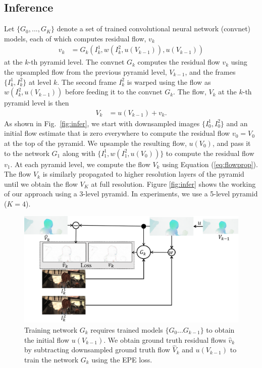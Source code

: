 \documentclass[10pt,twocolumn,letterpaper]{article}
\begin{document}
\subsection{Inference}
Let $\{G_0, ... ,G_K\}$ denote a  set of trained convolutional neural network (convnet) models,
each of which computes residual flow, $v_k$
\begin{align}
v_k &= G_k(I_k^1, w(I_k^2,u(V_{k-1}) ), u(V_{k-1}))
\end{align}
at the $k$-th pyramid level. The convnet $G_k$ computes the residual flow $v_k$ using the upsampled flow from the previous pyramid level, ${V_{k-1}}$, and the frames $\{ I^1_k, I^2_k \}$ at level $k$. 
The second frame $I^2_k$ is warped using the flow as $w(I^2_k, u({V_{k-1}}))$ before feeding it to the convnet $G_k$. The flow, $V_k$ at the $k$-th pyramid level is then 
\begin{align}
\label{eq:flowprop}
V_k &= u(V_{k-1}) + v_k .
\end{align}
As shown in Fig.~\ref{fig:infer}, we start with downsampled images $\{ I_0^1, I_0^2\}$ and an initial flow estimate that is zero everywhere to compute the residual flow $v_0 = V_0$ at the top of the pyramid. We upsample the resulting flow, $u(V_0)$, and pass it to the network $G_1$ along with $\{I_1^1, w(I_1^2, u(V_0)) \}$ to compute the residual flow $v_1$. At each pyramid level, we compute the flow $V_k$ using Equation (\ref{eq:flowprop}). The flow $V_k$ is similarly propagated to higher resolution layers of the pyramid until we obtain the flow $V_K$ at full resolution. 
Figure \ref{fig:infer} shows the working of our approach using a 3-level pyramid. In experiments, we use a 5-level pyramid ($K=4$).

\begin{figure}[t]
\centerline{   
\includegraphics[width=\linewidth]{Train3.png}
}
   \caption{Training network $G_k$ requires trained models $\{G_0 ... G_{k-1}\}$ to obtain the initial flow $u(V_{k-1})$. We obtain ground truth residual flows $\hat{v}_k$ by subtracting downsampled ground truth flow $\hat{V}_k$ and $u(V_{k-1})$ to train the network $G_k$ using the EPE loss.}
\label{fig:Train}
\end{figure}
\end{document}
